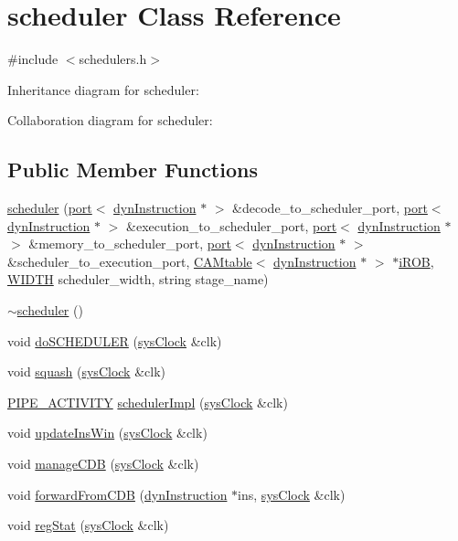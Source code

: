 \hypertarget{classscheduler}{
\section{scheduler Class Reference}
\label{classscheduler}
}


{\ttfamily \#include $<$schedulers.h$>$}



Inheritance diagram for scheduler:


Collaboration diagram for scheduler:
\subsection*{Public Member Functions}
\begin{DoxyCompactItemize}
\item 
\hyperlink{classscheduler_af495f5702c947e355eb2c54561ff069d}{scheduler} (\hyperlink{classport}{port}$<$ \hyperlink{classdynInstruction}{dynInstruction} $\ast$ $>$ \&decode\_\-to\_\-scheduler\_\-port, \hyperlink{classport}{port}$<$ \hyperlink{classdynInstruction}{dynInstruction} $\ast$ $>$ \&execution\_\-to\_\-scheduler\_\-port, \hyperlink{classport}{port}$<$ \hyperlink{classdynInstruction}{dynInstruction} $\ast$ $>$ \&memory\_\-to\_\-scheduler\_\-port, \hyperlink{classport}{port}$<$ \hyperlink{classdynInstruction}{dynInstruction} $\ast$ $>$ \&scheduler\_\-to\_\-execution\_\-port, \hyperlink{classCAMtable}{CAMtable}$<$ \hyperlink{classdynInstruction}{dynInstruction} $\ast$ $>$ $\ast$\hyperlink{backend_2parser_8cpp_ad73ae25f81e6e99482f3fbd5ba9664ce}{iROB}, \hyperlink{global_2global_8h_a6fa2e24b8a418fa215e183264cbea3aa}{WIDTH} scheduler\_\-width, string stage\_\-name)
\item 
\hyperlink{classscheduler_a4a0e4c12027ab0a23d8aa9e6d9e87ae0}{$\sim$scheduler} ()
\item 
void \hyperlink{classscheduler_a3253fffac337ef94b41e8dcef59dbd74}{doSCHEDULER} (\hyperlink{classsysClock}{sysClock} \&clk)
\item 
void \hyperlink{classscheduler_aa2248008ac06d971f08807593b9a09c2}{squash} (\hyperlink{classsysClock}{sysClock} \&clk)
\item 
\hyperlink{unit_2stage_8h_ab00e4188e8b8974fecb1dfd12764cbb1}{PIPE\_\-ACTIVITY} \hyperlink{classscheduler_a22fd96ca05e81346965e87c0e46b9cca}{schedulerImpl} (\hyperlink{classsysClock}{sysClock} \&clk)
\item 
void \hyperlink{classscheduler_a16ab416645e159625f83cf53bfa408cc}{updateInsWin} (\hyperlink{classsysClock}{sysClock} \&clk)
\item 
void \hyperlink{classscheduler_ad2cdc34a3fc36cf56755e73842a47d49}{manageCDB} (\hyperlink{classsysClock}{sysClock} \&clk)
\item 
void \hyperlink{classscheduler_a50c4d8d6c754c342adbd0750eacd7a64}{forwardFromCDB} (\hyperlink{classdynInstruction}{dynInstruction} $\ast$ins, \hyperlink{classsysClock}{sysClock} \&clk)
\item 
void \hyperlink{classscheduler_ab1cdff1168591f0166016829d460928a}{regStat} (\hyperlink{classsysClock}{sysClock} \&clk)
\end{DoxyCompactItemize}


